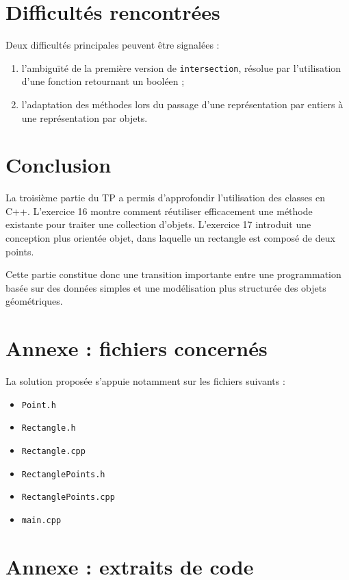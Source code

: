 \documentclass[12pt,a4paper]{article}
\begin{document}
\section{Difficult\'es rencontr\'ees}
Deux difficult\'es principales peuvent \^etre signal\'ees :
\begin{enumerate}[leftmargin=*]
    \item l'ambigu\"it\'e de la premi\`ere version de \texttt{intersection}, r\'esolue par l'utilisation d'une fonction retournant un bool\'een ;
    \item l'adaptation des m\'ethodes lors du passage d'une repr\'esentation par entiers \`a une repr\'esentation par objets.
\end{enumerate}

\section{Conclusion}
La troisi\`eme partie du TP a permis d'approfondir l'utilisation des classes en C++. L'exercice 16 montre comment r\'eutiliser efficacement une m\'ethode existante pour traiter une collection d'objets. L'exercice 17 introduit une conception plus orient\'ee objet, dans laquelle un rectangle est compos\'e de deux points.

Cette partie constitue donc une transition importante entre une programmation bas\'ee sur des donn\'ees simples et une mod\'elisation plus structur\'ee des objets g\'eom\'etriques.

\section*{Annexe : fichiers concern\'es}
La solution propos\'ee s'appuie notamment sur les fichiers suivants :
\begin{itemize}[leftmargin=*]
    \item \texttt{Point.h}
    \item \texttt{Rectangle.h}
    \item \texttt{Rectangle.cpp}
    \item \texttt{RectanglePoints.h}
    \item \texttt{RectanglePoints.cpp}
    \item \texttt{main.cpp}
\end{itemize}

\section*{Annexe : extraits de code}
\end{document}
